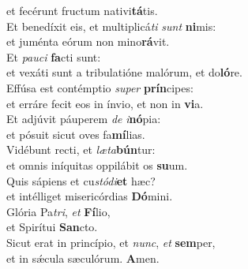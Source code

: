\oddverse et fecérunt fructum nativi\textbf{tá}tis.\\
\evenverse Et benedíxit eis, et multiplicá\textit{ti} \textit{sunt} \textbf{ni}mis:~\*\\
\evenverse et juménta eórum non mino\textbf{rá}vit.\\
\oddverse Et \textit{pau}\textit{ci} \textbf{fa}cti sunt:~\*\\
\oddverse et vexáti sunt a tribulatióne malórum, et do\textbf{ló}re.\\
\evenverse Effúsa est contémptio \textit{su}\textit{per} \textbf{prín}cipes:~\*\\
\evenverse et erráre fecit eos in ínvio, et non in \textbf{vi}a.\\
\oddverse Et adjúvit páuperem \textit{de} \textit{i}\textbf{nó}pia:~\*\\
\oddverse et pósuit sicut oves fa\textbf{mí}lias.\\
\evenverse Vidébunt recti, et \textit{læ}\textit{ta}\textbf{bún}tur:~\*\\
\evenverse et omnis iníquitas oppilábit os \textbf{su}um.\\
\oddverse Quis sápiens et cu\textit{stó}\textit{di}\textbf{et} hæc?~\*\\
\oddverse et intélliget misericórdias \textbf{Dó}mini.\\
\evenverse Glória Pa\textit{tri}, \textit{et} \textbf{Fí}lio,~\*\\
\evenverse et Spirítui \textbf{San}cto.\\
\oddverse Sicut erat in princípio, et \textit{nunc}, \textit{et} \textbf{sem}per,~\*\\
\oddverse et in sǽcula sæculórum. \textbf{A}men.\\
